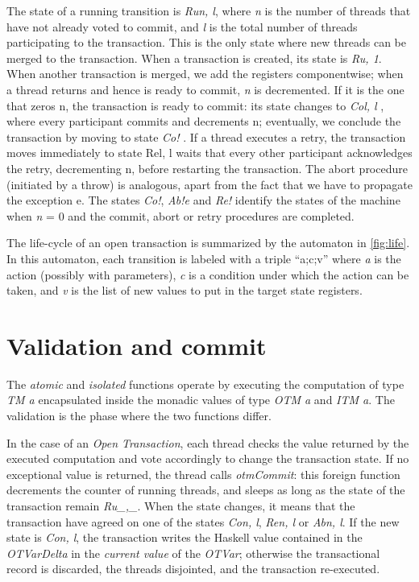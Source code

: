 The state of a running transition is \emph{Ru\textlangle n, l\textrangle}, where \emph{n} is the number of threads that have not already voted to commit, and \emph{l} is the total number of threads participating to the transaction.
This is the only state where new threads can be merged to the transaction. When a transaction is created, its state is \emph{Ru, 1\textrangle}.
When another transaction is merged, we add the registers componentwise; when a thread returns and hence is ready to commit, \emph{n} is decremented.
If it is the one that zeros n, the transaction is ready to commit: its state changes to \emph{Co\textlangle l, l\textrangle} , where every participant commits and decrements n; eventually, we conclude the transaction by moving to state \emph{Co!\textlangle \textrangle} .
If a thread executes a retry, the transaction moves immediately to state Re\textlangle l, l\textrangle\xspace waits that every other participant acknowledges the retry, decrementing n, before restarting the transaction.
The abort procedure (initiated by a throw) is analogous, apart from the fact that we have to propagate the exception e.
The states \emph{Co!\textlangle \textrangle }, \emph{Ab!\textlangle e\textrangle}  and \emph{Re!\textlangle \textrangle}  identify the states of the machine when \emph{n} = 0 and the commit, abort or retry procedures are completed.

The life-cycle of an open transaction is summarized by the automaton in \cref{fig:life}.
In this automaton, each transition is labeled with a triple ``a;c;v'' where \emph{a} is the action (possibly with parameters), \emph{c} is a condition under which the action can be taken, and \emph{v} is the list of new values to put in the target state registers.

\section{Validation and commit}

The \emph{atomic} and \emph{isolated} functions operate by executing the computation of type \emph{TM a} encapsulated inside the monadic values of type \emph{OTM a} and \emph{ITM a}.
The validation is the phase where the two functions differ.

In the case of an \emph{Open Transaction}, each thread checks the value returned by the executed computation and vote accordingly to change the transaction state.
If no exceptional value is returned, the thread calls \emph{otmCommit}: this foreign function decrements the counter of running threads, and sleeps as long as the state of the transaction remain \emph{Ru\textlangle \_,\_\textrangle}.
When the state changes, it means that the transaction have agreed on one of the states \emph{Co\textlangle n, l\textrangle}, \emph{Re\textlangle n, l\textrangle} or \emph{Ab\textlangle n, l\textrangle}.
If the new state is \emph{Co\textlangle n, l\textrangle}, the transaction writes the Haskell value contained in the \emph{OTVarDelta} in the \emph{current value} of the \emph{OTVar}; otherwise the transactional record is discarded, the threads disjointed, and the transaction re-executed.

